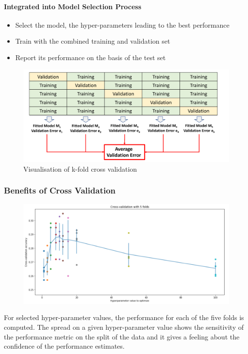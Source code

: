 \documentclass[11pt]{article}
\begin{document}
\paragraph{Integrated into Model Selection Process}
\begin{itemize}
	\item Select the model, the hyper-parameters leading to the best performance
	\item Train with the combined training and validation set
	\item Report its performance on the basis of the test set
\end{itemize}

\begin{figure}[tbh]
	\centering
	\includegraphics[width=0.8\linewidth, keepaspectratio]{k_fold_cross_validation}
	\caption{Visualisation of k-fold cross validation}
	\label{fig:kfoldcrossvalidation}
\end{figure}

\subsubsection{Benefits of Cross Validation}

\begin{figure}[H]
	\centering
	\includegraphics[width=0.6\linewidth]{img/k_fold_cross_validation_benefits}
\end{figure}

For selected hyper-parameter values, the performance for each of the five folds is computed. The spread on a given hyper-parameter value shows the sensitivity of the performance metric on the split of the data and it gives a feeling about the confidence of the performance estimates.
\end{document}

